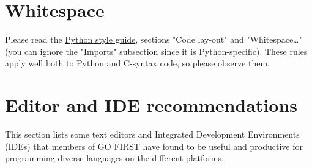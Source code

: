 \documentclass{article}
\begin{document}
\section{Whitespace}
Please read the \hyperref[pyguide]{Python style guide}, sections "Code lay-out" and "Whitespace\ldots" (you can ignore the "Imports" subsection since it is Python-specific). These rules apply well both to Python and C-syntax code, so please observe them.

\appendix
\section{Editor and IDE recommendations}
\label{sec:editors}
This section lists some text editors and Integrated Development Environments (IDEs) that members of GO FIRST have found to be useful and productive for programming diverse languages on the different platforms.
\end{document}
